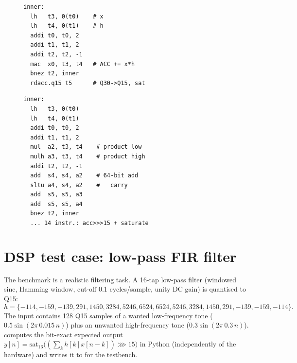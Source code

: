 \begin{figure}[H]
\begin{minipage}[t]{0.40\linewidth}
\begin{lstlisting}[language={}, basicstyle=\ttfamily\scriptsize, numbers=none, title={\code{fir\_mac\_loop} (7 instr./tap)}]
inner:
  lh   t3, 0(t0)    # x
  lh   t4, 0(t1)    # h
  addi t0, t0, 2
  addi t1, t1, 2
  addi t2, t2, -1
  mac  x0, t3, t4   # ACC += x*h
  bnez t2, inner
  rdacc.q15 t5      # Q30->Q15, sat
\end{lstlisting}
\end{minipage}\hfill
\begin{minipage}[t]{0.56\linewidth}
\begin{lstlisting}[language={}, basicstyle=\ttfamily\scriptsize, numbers=none, title={\code{fir\_rv32im\_loop} (12 instr./tap)}]
inner:
  lh   t3, 0(t0)
  lh   t4, 0(t1)
  addi t0, t0, 2
  addi t1, t1, 2
  mul  a2, t3, t4    # product low
  mulh a3, t3, t4    # product high
  addi t2, t2, -1
  add  s4, s4, a2    # 64-bit add
  sltu a4, s4, a2    #   carry
  add  s5, s5, a3
  add  s5, s5, a4
  bnez t2, inner
  ... 14 instr.: acc>>>15 + saturate
\end{lstlisting}
\end{minipage}
\label{lst:firloops}
\end{figure}

\section{DSP test case: low-pass FIR filter}
The benchmark is a realistic filtering task. A 16-tap low-pass filter
(windowed sinc, Hamming window, cut-off 0.1 cycles/sample, unity DC gain) is
quantised to Q15:
\[
h = \{-114, -159, -139, 291, 1450, 3284, 5246, 6524, 6524, 5246, 3284, 1450, 291, -139, -159, -114\}.
\]
The input contains 128 Q15 samples of a wanted low-frequency tone
($0.5\sin(2\pi\,0.015\,n)$) plus an unwanted high-frequency tone
($0.3\sin(2\pi\,0.3\,n)$).  computes the bit-exact expected output
$y[n]=\mathrm{sat}_{16}\big((\sum_k h[k]x[n-k]) \ggg 15\big)$ in Python
(independently of the hardware) and writes it to 
for the testbench.
